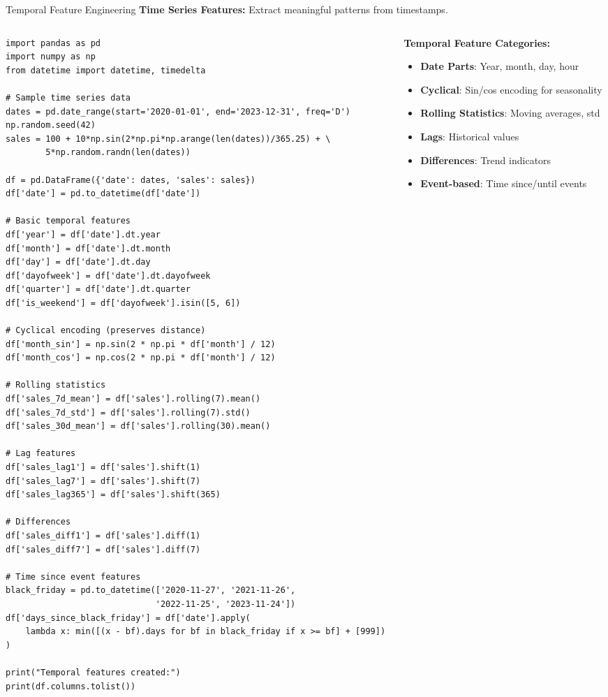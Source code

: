 \documentclass[aspectratio=169,11pt]{beamer}
\begin{document}
\begin{frame}[fragile]{Temporal Feature Engineering}
\textbf{Time Series Features:} Extract meaningful patterns from timestamps.

\begin{columns}
\begin{column}{0.55\textwidth}
\begin{lstlisting}
import pandas as pd
import numpy as np
from datetime import datetime, timedelta

# Sample time series data
dates = pd.date_range(start='2020-01-01', end='2023-12-31', freq='D')
np.random.seed(42)
sales = 100 + 10*np.sin(2*np.pi*np.arange(len(dates))/365.25) + \
        5*np.random.randn(len(dates))

df = pd.DataFrame({'date': dates, 'sales': sales})
df['date'] = pd.to_datetime(df['date'])

# Basic temporal features
df['year'] = df['date'].dt.year
df['month'] = df['date'].dt.month
df['day'] = df['date'].dt.day
df['dayofweek'] = df['date'].dt.dayofweek
df['quarter'] = df['date'].dt.quarter
df['is_weekend'] = df['dayofweek'].isin([5, 6])

# Cyclical encoding (preserves distance)
df['month_sin'] = np.sin(2 * np.pi * df['month'] / 12)
df['month_cos'] = np.cos(2 * np.pi * df['month'] / 12)

# Rolling statistics
df['sales_7d_mean'] = df['sales'].rolling(7).mean()
df['sales_7d_std'] = df['sales'].rolling(7).std()
df['sales_30d_mean'] = df['sales'].rolling(30).mean()

# Lag features
df['sales_lag1'] = df['sales'].shift(1)
df['sales_lag7'] = df['sales'].shift(7)
df['sales_lag365'] = df['sales'].shift(365)

# Differences
df['sales_diff1'] = df['sales'].diff(1)
df['sales_diff7'] = df['sales'].diff(7)

# Time since event features
black_friday = pd.to_datetime(['2020-11-27', '2021-11-26', 
                              '2022-11-25', '2023-11-24'])
df['days_since_black_friday'] = df['date'].apply(
    lambda x: min([(x - bf).days for bf in black_friday if x >= bf] + [999])
)

print("Temporal features created:")
print(df.columns.tolist())
\end{lstlisting}
\end{column}
\begin{column}{0.45\textwidth}
\textbf{Temporal Feature Categories:}

\begin{itemize}
\item \textbf{Date Parts}: Year, month, day, hour
\item \textbf{Cyclical}: Sin/cos encoding for seasonality
\item \textbf{Rolling Statistics}: Moving averages, std
\item \textbf{Lags}: Historical values
\item \textbf{Differences}: Trend indicators
\item \textbf{Event-based}: Time since/until events
\end{itemize}


\end{column}
\end{columns}
\end{frame}
\end{document}
